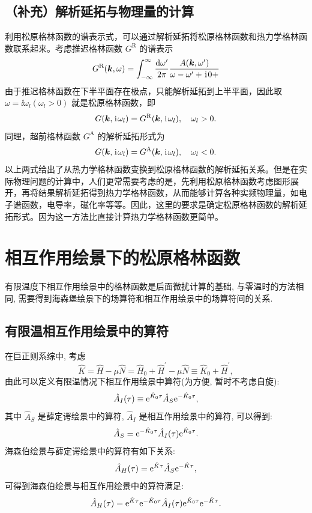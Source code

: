 \subsection{（补充）解析延拓与物理量的计算}
利用松原格林函数的谱表示式，可以通过解析延拓将松原格林函数和热力学格林函数联系起来。考虑推迟格林函数 $G^{\text{R}}$ 的谱表示 
\begin{equation}
    G^{\text{R}}(\boldsymbol{k},\omega)=\int_{-\infty}^{\infty}\frac{\mathrm{d}\omega'}{2\pi}\frac{A(\boldsymbol{k},\omega')}{\omega-\omega'+\hspace{0.1em}\mathrm{i}\hspace{0.1em} 0+}
\end{equation}
由于推迟格林函数在下半平面存在极点，只能解析延拓到上半平面，因此取 $\omega=\ii\omega_l(\omega_l>0)$ 就是松原格林函数，即 
\begin{equation}
    G(\boldsymbol{k},\hspace{0.1em}\mathrm{i}\hspace{0.1em}\omega_l)=G^{\mathrm{R}}(\boldsymbol{k},\hspace{0.1em}\mathrm{i}\hspace{0.1em}\omega_l),\quad \omega_l>0.
\end{equation}
同理，超前格林函数 $G^{\text{A}}$ 的解析延拓形式为
\begin{equation}
    G(\boldsymbol{k},\hspace{0.1em}\mathrm{i}\hspace{0.1em}\omega_l)=G^{\text{A}}(\boldsymbol{k},\hspace{0.1em}\mathrm{i}\hspace{0.1em}\omega_l),\quad \omega_l<0.
\end{equation}
以上两式给出了从热力学格林函数变换到松原格林函数的解析延拓关系。但是在实际物理问题的计算中，人们更常需要考虑的是，先利用松原格林函数考虑图形展开，再将结果解析延拓得到热力学格林函数，从而能够计算各种实频物理量，如电子谱函数，电导率，磁化率等等。因此，这里的要求是确定松原格林函数的解析延拓形式。因为这一方法比直接计算热力学格林函数更简单。
\section{相互作用绘景下的松原格林函数}
有限温度下相互作用绘景中的格林函数是后面微扰计算的基础, 与零温时的方法相同, 需要得到海森堡绘景下的场算符和相互作用绘景中的场算符间的关系.

\subsection{有限温相互作用绘景中的算符}
在巨正则系综中, 考虑
\begin{equation}
\hat{K}=\hat{H}-\mu\hat{N}=\hat{H}_0+\hat{H}^\prime-\mu\hat{N}\equiv\hat{K}_0+\hat{H}^\prime,
\end{equation}
由此可以定义有限温情况下相互作用绘景中算符(为方便, 暂时不考虑自旋):
\begin{equation}
\hat{A}_I(\tau) \equiv \mathrm{e}^{\hat{K}_0 \tau} \hat{A}_S \mathrm{e}^{-\hat{K}_0 \tau},
\end{equation}
其中 $\hat{A}_S$ 是薛定谔绘景中的算符, $\hat{A}_I$ 是相互作用绘景中的算符, 可以得到:
\begin{equation}
\hat{A}_S=\mathrm{e}^{-\hat{K}_0 \tau} \hat{A}_I(\tau) \mathrm{e}^{\hat{K}_0 \tau}.
\end{equation}
海森伯绘景与薛定谔绘景中的算符有如下关系:
\begin{equation}
\hat{A}_{H}(\tau)= \mathrm{e}^{\hat{K}\tau}\hat{A}_S\mathrm{e}^{-\hat{K}\tau},
\end{equation}
可得到海森伯绘景与相互作用绘景中的算符满足:
\begin{equation}\label{HI}
\hat{A}_{H}(\tau)= \mathrm{e}^{\hat{K}\tau}\mathrm{e}^{-\hat{K}_0 \tau} \hat{A}_I(\tau) \mathrm{e}^{\hat{K}_0 \tau}\mathrm{e}^{-\hat{K}\tau}.
\end{equation}

